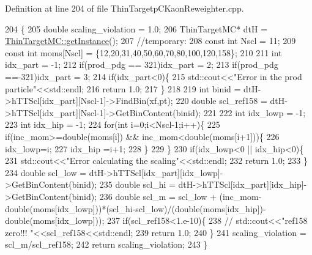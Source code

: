Definition at line 204 of file Thin\-Targetp\-C\-Kaon\-Reweighter.\-cpp.


\begin{DoxyCode}
204                                                                                                            
                \{
205     \textcolor{keywordtype}{double} scaling\_violation = 1.0;
206     ThinTargetMC*  dtH =  \hyperlink{class_neutrino_flux_reweight_1_1_thin_target_m_c_a2a114747fed2677cd3b7213555c002b9}{ThinTargetMC::getInstance}();
207     \textcolor{comment}{//temporary:}
208     \textcolor{keyword}{const} \textcolor{keywordtype}{int} Nscl = 11;
209     \textcolor{keyword}{const} \textcolor{keywordtype}{int} moms[Nscl] = \{12,20,31,40,50,60,70,80,100,120,158\};
210     
211     \textcolor{keywordtype}{int} idx\_part = -1;
212     \textcolor{keywordflow}{if}(prod\_pdg == 321)idx\_part = 2;
213     \textcolor{keywordflow}{if}(prod\_pdg ==-321)idx\_part = 3;
214     \textcolor{keywordflow}{if}(idx\_part<0)\{
215       std::cout<<\textcolor{stringliteral}{"Error in the prod particle"}<<std::endl;
216       \textcolor{keywordflow}{return} 1.0;
217     \}
218     
219     \textcolor{keywordtype}{int} binid = dtH->hTTScl[idx\_part][Nscl-1]->FindBin(xf,pt);
220     \textcolor{keywordtype}{double} scl\_ref158 = dtH->hTTScl[idx\_part][Nscl-1]->GetBinContent(binid);    
221     
222     \textcolor{keywordtype}{int} idx\_lowp = -1;
223     \textcolor{keywordtype}{int} idx\_hip  = -1;
224     \textcolor{keywordflow}{for}(\textcolor{keywordtype}{int} i=0;i<Nscl-1;i++)\{
225       \textcolor{keywordflow}{if}(inc\_mom>=\textcolor{keywordtype}{double}(moms[i]) && inc\_mom<\textcolor{keywordtype}{double}(moms[i+1]))\{
226         idx\_lowp=i;
227         idx\_hip =i+1;
228       \}
229     \}
230     \textcolor{keywordflow}{if}(idx\_lowp<0 || idx\_hip<0)\{
231       std::cout<<\textcolor{stringliteral}{"Error calculating the scaling"}<<std::endl;
232       \textcolor{keywordflow}{return} 1.0;
233     \}
234     \textcolor{keywordtype}{double} scl\_low = dtH->hTTScl[idx\_part][idx\_lowp]->GetBinContent(binid);
235     \textcolor{keywordtype}{double} scl\_hi  = dtH->hTTScl[idx\_part][idx\_hip]->GetBinContent(binid);
236     \textcolor{keywordtype}{double} scl\_m   =  scl\_low + (inc\_mom-double(moms[idx\_lowp]))*(scl\_hi-scl\_low)/(double(moms[idx\_hip])-
      double(moms[idx\_lowp]));
237     \textcolor{keywordflow}{if}(scl\_ref158<1.e-10)\{
238       \textcolor{comment}{// std::cout<<"ref158 zero!!! "<<scl\_ref158<<std::endl;}
239       \textcolor{keywordflow}{return} 1.0;
240     \}
241     scaling\_violation = scl\_m/scl\_ref158;
242     \textcolor{keywordflow}{return} scaling\_violation;
243   \}
\end{DoxyCode}
